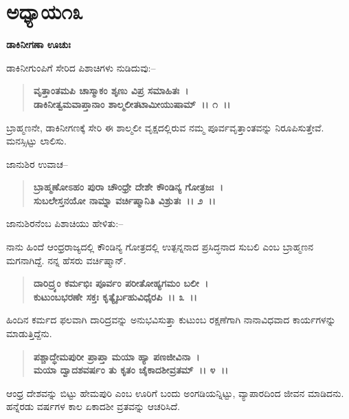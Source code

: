 \newpage

\section*{ಅಧ್ಯಾಯ೧೩}

\emptypage

\begin{flushleft}
\textbf{ಡಾಕಿನೀಗಣಾ ಊಚುಃ}
\end{flushleft}

ಡಾಕಿನೀಗುಂಪಿಗೆ ಸೇರಿದ ಪಿಶಾಚಿಗಳು ನುಡಿದುವು:–

\begin{verse}
\textbf{ವೃತ್ತಾಂತಮಪಿ ಚಾಸ್ಮಾಕಂ ಶೃಣು ವಿಪ್ರ ಸಮಾಹಿತಃ~।}\\\textbf{ಡಾಕಿನೀತ್ವಮವಾಪ್ತಾನಾಂ ಶಾಲ್ಮಲೀತಟಾಮೀಯುಷಾಮ್~।। ೧~।।}
\end{verse}

ಬ್ರಾಹ್ಮಣನೇ, ಡಾಕಿನೀಗಣಕ್ಕೆ ಸೇರಿ ಈ ಶಾಲ್ಮಲೀ ವೃಕ್ಷದಲ್ಲಿರುವ ನಮ್ಮ ಪೂರ್ವವೃತ್ತಾಂತವನ್ನು ನಿರೂಪಿಸುತ್ತೇವೆ. ಮನಸ್ಸಿಟ್ಟು ಲಾಲಿಸು.

\begin{flushleft}
ಜಾನುಶಿರ ಉವಾಚ–
\end{flushleft}

\begin{verse}
\textbf{ಬ್ರಾಹ್ಮಣೋಽಹಂ ಪುರಾ ಚೌಂಧ್ರೇ ದೇಶೇ ಕೌಂಡಿನ್ಯ ಗೋತ್ರಜಃ~।}\\\textbf{ಸುಬಲೇಸ್ತನಯೋ ನಾಮ್ನಾ ವರ್ಚಿಷ್ಮಾನಿತಿ ವಿಶ್ರುತಃ~।। ೨~।।}
\end{verse}

ಜಾನುಶಿರನೆಂಬ ಪಿಶಾಚಿಯು ಹೇಳಿತು:–

ನಾನು ಹಿಂದೆ ಆಂಧ್ರರಾಜ್ಯದಲ್ಲಿ ಕೌಂಡಿನ್ಯ ಗೋತ್ರದಲ್ಲಿ ಉತ್ಪನ್ನನಾದ ಪ್ರಸಿದ್ಧನಾದ ಸುಬಲಿ ಎಂಬ ಬ್ರಾಹ್ಮಣನ ಮಗನಾಗಿದ್ದೆ. ನನ್ನ ಹೆಸರು ವರ್ಚಿಷ್ಮಾನ್.

\begin{verse}
\textbf{ದಾರಿದ್ರ್ಯಂ ಕರ್ಮಭಿಃ ಪೂರ್ವಂ ಪರೀತೋಹ್ಯಗಮಂ ಬಲೀ~।}\\\textbf{ಕುಟುಂಬಭರಣೇ ಸಕ್ತಃ ಕೃತ್ಯೈರ್ಬಹುವಿಧೈರಪಿ~।। ೩~।।}
\end{verse}

ಹಿಂದಿನ ಕರ್ಮದ ಫಲವಾಗಿ ದಾರಿದ್ರವನ್ನು ಅನುಭವಿಸುತ್ತಾ ಕುಟುಂಬ ರಕ್ಷಣೆಗಾಗಿ ನಾನಾವಿಧವಾದ ಕಾರ್ಯಗಳನ್ನು ಮಾಡುತ್ತಿದ್ದೆನು.

\begin{verse}
\textbf{ಪಶ್ಚಾದ್ಧೇಮಪುರೀ ಪ್ರಾಪ್ತಾ ಮಯಾ ಹ್ಯಾ ಪಣಜೀವಿನಾ~।}\\\textbf{ಮಯಾ ದ್ವಾದಶವರ್ಷಂ ತು ಕೃತಂ ಚೈಕಾದಶೀವ್ರತಮ್~।। ೪~।।}
\end{verse}

ಆಂಧ್ರ ದೇಶವನ್ನು ಬಿಟ್ಟು ಹೇಮಪುರಿ ಎಂಬ ಊರಿಗೆ ಬಂದು ಅಂಗಡಿಯನ್ನಿಟ್ಟು, ವ್ಯಾಪಾರದಿಂದ ಜೀವನ ಮಾಡಿದನು. ಹನ್ನೆರಡು ವರ್ಷಗಳ ಕಾಲ ಏಕಾದಶೀ ವ್ರತವನ್ನು ಆಚರಿಸಿದೆ.

